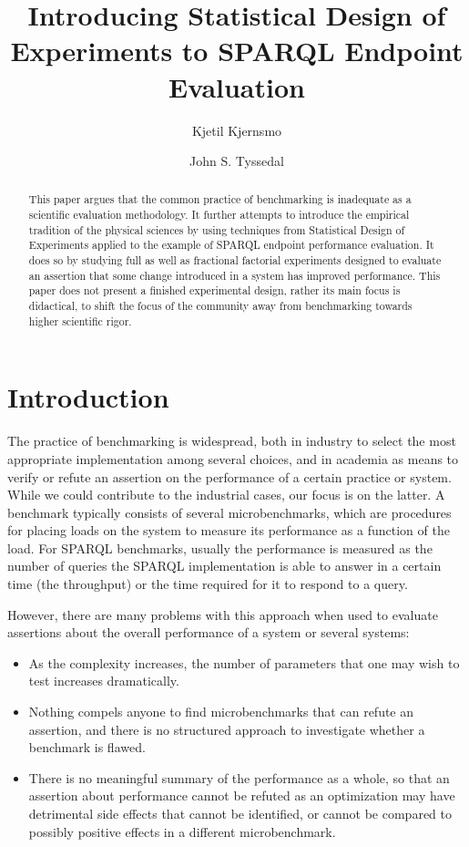 \documentclass{llncs}
\title{Introducing Statistical Design of Experiments to SPARQL
  Endpoint Evaluation}
\author{Kjetil Kjernsmo\inst{1} \and John S. Tyssedal\inst{2}}
\institute{Department of Informatics,
Postboks 1080 Blindern,
N-0316 Oslo, Norway \email{kjekje@ifi.uio.no} \and Department of Mathematical Sciences,
Norwegian University of Science and Technology,
N-7491 Trondheim,
Norway
\email{john.tyssedal@math.ntnu.no}}
\begin{document}
\maketitle

\begin{abstract}
This paper argues that the common practice of benchmarking is
inadequate as a scientific evaluation methodology. It further attempts
to introduce the empirical tradition of the physical sciences by using
techniques from Statistical Design of Experiments applied to the
example of SPARQL endpoint performance evaluation. It does so by
studying full as well as fractional factorial experiments designed to
evaluate an assertion that some change introduced in a system has
improved performance. This paper does not present a finished
experimental design, rather its main focus is didactical, to shift the
focus of the community away from benchmarking towards higher
scientific rigor.
\end{abstract}

\section{Introduction}

The practice of benchmarking is widespread, both in industry to select
the most appropriate implementation among several choices, and in
academia as means to verify or refute an assertion on the performance
of a certain practice or system. While we could contribute to the
industrial cases, our focus is on the latter. A benchmark typically
consists of several microbenchmarks, which are procedures for placing
loads on the system to measure its performance as a function of the
load. For SPARQL benchmarks, usually the performance is measured as
the number of queries the SPARQL implementation is able to answer in a
certain time (the throughput) or the time required for it to respond
to a query.

However, there are many problems with this approach when used to
evaluate assertions about the overall performance of a system or
several systems:
\begin{itemize}
\item As the complexity increases, the number of parameters that one
  may wish to test increases dramatically.
\item Nothing compels anyone to find microbenchmarks that can refute
  an assertion, and there is no structured approach to investigate
  whether a benchmark is flawed.
\item There is no meaningful summary of the performance as a whole, so
  that an assertion about performance cannot be refuted as an
  optimization may have detrimental side effects that cannot be
  identified, or cannot be compared to possibly positive effects in a
  different microbenchmark.
\end{itemize}
\end{document}
